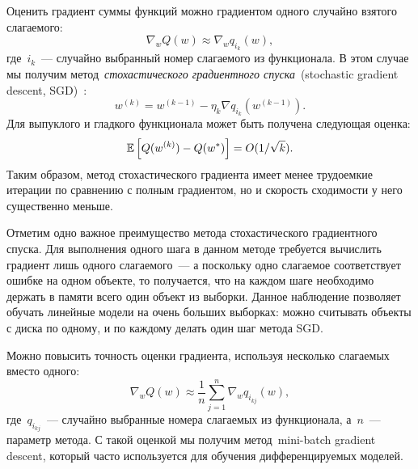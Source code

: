 \documentclass[12pt,fleqn]{article}
\begin{document}
Оценить градиент суммы функций можно градиентом одного случайно взятого слагаемого:
\[
    \nabla_w Q(w)
    \approx
    \nabla_w q_{i_k}(w),
\]
где~$i_k$~--- случайно выбранный номер слагаемого из функционала.
В этом случае мы получим метод~\emph{стохастического
градиентного спуска}~(stochastic gradient descent, SGD)~\cite{robbins51stochastic}:
\[
    w^{(k)} = w^{(k - 1)} - \eta_k \nabla q_{i_k}(w^{(k - 1)}).
\]
Для выпуклого и гладкого функционала может быть получена
следующая оценка:
\[
    \mathbb{E} \left[
        Q(w^{(k)}) - Q(w^*)
    \right]
    =
    O(1 / \sqrt{k}).
\]
Таким образом, метод стохастического градиента имеет менее
трудоемкие итерации по сравнению с полным градиентом,
но и скорость сходимости у него существенно меньше.

Отметим одно важное преимущество метода стохастического градиентного спуска.
Для выполнения одного шага в данном методе требуется вычислить градиент лишь одного слагаемого~---
а поскольку одно слагаемое соответствует ошибке на одном объекте,
то получается, что на каждом шаге необходимо держать в памяти всего один объект из выборки.
Данное наблюдение позволяет обучать линейные модели на очень больших выборках:
можно считывать объекты с диска по одному, и по каждому делать один шаг метода SGD.

Можно повысить точность оценки градиента, используя несколько слагаемых вместо одного:
\[
    \nabla_w Q(w)
    \approx
    \frac{1}{n}
    \sum_{j = 1}^{n}
    \nabla_w q_{i_{kj}}(w),
\]
где~$q_{i_{kj}}$~--- случайно выбранные номера слагаемых из функционала,
а~$n$~--- параметр метода.
С такой оценкой мы получим метод~mini-batch gradient descent,
который часто используется для обучения дифференцируемых моделей.
\end{document}
